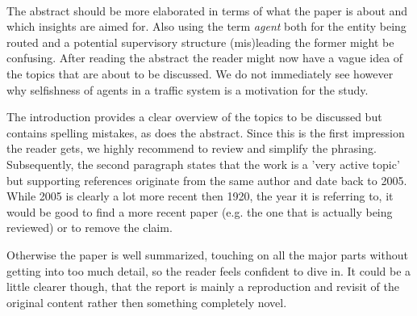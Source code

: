 \documentclass[../review.tex]{subfiles}
\begin{document}
 \textcolor{green}{\Large\checkmark}\\
The abstract should be more elaborated in terms of what the paper is about and which insights are aimed for. Also using the term \textit{agent} both for the entity being routed and a potential supervisory structure (mis)leading the former might be confusing. After reading the abstract the reader might now have a vague idea of the topics that are about to be discussed. We do not immediately see however why selfishness of agents in a traffic system is a motivation for the study.

The introduction provides a clear overview of the topics to be discussed but contains spelling mistakes, as does the abstract. Since this is the first impression the reader gets, we highly recommend to review and simplify the phrasing. Subsequently, the second paragraph states that the work is a 'very active topic' but supporting references originate from the same author and date back to 2005. While 2005 is clearly a lot more recent then 1920, the year it is referring to, it would be good to find a more recent paper (e.g. the one that is actually being reviewed) or to remove the claim.

Otherwise the paper is well summarized, touching on all the major parts without getting into too much detail, so the reader feels confident to dive in. It could be a little clearer though, that the report is mainly a reproduction and revisit of the original content rather then something completely novel.
\end{document}
